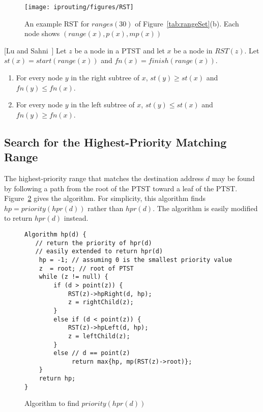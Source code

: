 \begin{figure}[ht]
\begin{center}
\texttt{[image: iprouting/figures/RST]}
\caption{An example RST for $ranges(30)$ of
Figure~\ref{tab:rangeSet}(b). Each node shows $(range(x), p(x), mp(x))$}
\label{fig:exampleRST}
\end{center}
\end{figure}

\begin{lemma}\label{lemma:endpointInRST}[Lu and Sahni~\cite{lu1}]
Let $z$ be a node in a PTST and let $x$ be a node in $RST(z)$.
Let $st(x) = start(range(x))$ and $fn(x) = finish(range(x))$.
\begin{enumerate}
\item\label{enum:a}
For every node $y$ in the right subtree of $x$,
$st(y) \ge st(x)$ and $fn(y) \le fn(x)$.
\item\label{enum:b}
For every node $y$ in the left subtree of $x$,
$st(y) \le st(x)$ and $fn(y) \ge fn(x)$.
\end{enumerate}
\end{lemma} 


\subsection{Search for the Highest-Priority Matching Range}
The highest-priority range that matches the destination address $d$ may be
found by following a path from the root of the PTST toward a leaf of the PTST.
Figure~\ref{fig:hpr} gives the algorithm. For simplicity, this algorithm
finds $hp = priority(hpr(d))$ rather than $hpr(d)$. The algorithm is easily
modified to return $hpr(d)$ instead.

\begin{figure}[ht]
\begin{verbatim} 
Algorithm hp(d) {
   // return the priority of hpr(d)
   // easily extended to return hpr(d)
    hp = -1; // assuming 0 is the smallest priority value
    z  = root; // root of PTST
    while (z != null) {
        if (d > point(z)) { 
            RST(z)->hpRight(d, hp);  
            z = rightChild(z);
        }
        else if (d < point(z)) {
            RST(z)->hpLeft(d, hp); 
            z = leftChild(z); 
        }
        else // d == point(z)
             return max{hp, mp(RST(z)->root)}; 
    }
    return hp;
}
\end{verbatim}
\caption{Algorithm to find $priority(hpr(d))$}
\label{fig:hpr} 
\end{figure}



